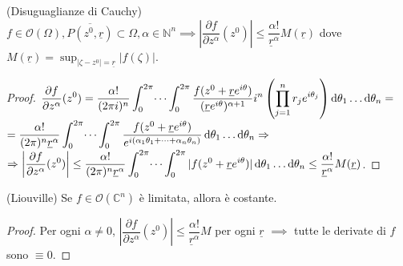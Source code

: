 \begin{prop}
  (Disuguaglianze di Cauchy) $f \in \mathcal{O}(\Omega), \overline{P(z^0, \underline{r})} \subset \Omega, \alpha \in \mathbb{N}^n \implies \left|\dfrac{\partial f}{\partial z^\alpha}(z^0)\right| \le \dfrac{\alpha!}{\underline{r}^\alpha}M(\underline{r})$ dove $\displaystyle M(\underline{r})=\sup_{|\zeta-z^0|=\underline{r}} |f(\zeta)|$.
\end{prop}

\begin{proof}
  $\displaystyle \dfrac{\partial f}{\partial z^\alpha}(z^0)=\dfrac{\alpha!}{(2\pi i)^n} \int_0^{2\pi} \dots \int_0^{2\pi} \frac{f(z^0+\underline{r}e^{i\theta})}{(\underline{r}e^{i\theta})^{\alpha+1}}i^n\left(\prod_{j=1}^n r_je^{i\theta_j}\right)\mathop{}\!\mathrm{d}\theta_1\dots\mathop{}\!\mathrm{d}\theta_n=$\\
  $\displaystyle =\frac{\alpha!}{(2\pi)^n\underline{r}^\alpha}\int_0^{2\pi} \dots \int_0^{2\pi} \frac{f(z^0+\underline{r}e^{i\theta})}{e^{i(\alpha_1\theta_1+\dots+\alpha_n\theta_n)}}\mathop{}\!\mathrm{d}\theta_1\dots\mathop{}\!\mathrm{d}\theta_n \Rightarrow$ \\
  $\displaystyle \Rightarrow \left|\dfrac{\partial f}{\partial z^\alpha}(z^0)\right| \le \frac{\alpha!}{(2\pi)^n\underline{r}^\alpha}\int_0^{2\pi} \dots \int_0^{2\pi} |f(z^0+\underline{r}e^{i\theta})|\mathop{}\!\mathrm{d}\theta_1\dots\mathop{}\!\mathrm{d}\theta_n \le \dfrac{\alpha!}{\underline{r}^\alpha}M(\underline{r})$.
\end{proof}

\begin{cor}
  (Liouville) Se $f \in \mathcal{O}(\mathbb{C}^n)$ è limitata, allora è costante.
\end{cor}

\begin{proof}
  Per ogni $\alpha \not=0$, $\left|\dfrac{\partial f}{\partial z^\alpha}(z^0)\right| \le \dfrac{\alpha!}{\underline{r}^\alpha}M$ per ogni $\underline{r}$ $\implies$ tutte le derivate di $f$ sono $\equiv 0$.
\end{proof}
